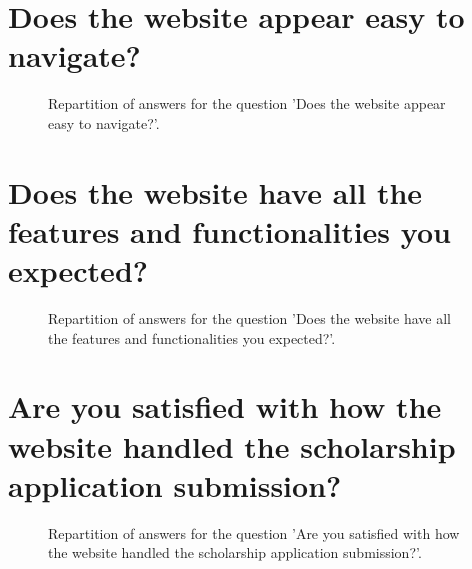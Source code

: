 \documentclass[12pt]{article}
\date{November 22, 2023}
\begin{document}
\clearpage{}
\section{Does the website appear easy to navigate?}

\label{sec:1}


\begin{figure}[h!]
    \caption{\label{figure:q1-1}Repartition of answers for the question 'Does the website appear easy to navigate?'.}
\end{figure}



\clearpage{}
\section{Does the website have all the features and functionalities you expected?}

\label{sec:2}


\begin{figure}[h!]
    \caption{\label{figure:q2-1}Repartition of answers for the question 'Does the website have all the features and functionalities you expected?'.}
\end{figure}



\clearpage{}
\section{Are you satisfied with how the website handled the scholarship application submission?}

\label{sec:3}


\begin{figure}[h!]
    \caption{\label{figure:q3-1}Repartition of answers for the question 'Are you satisfied with how the website handled the scholarship application submission?'.}
\end{figure}
\end{document}
